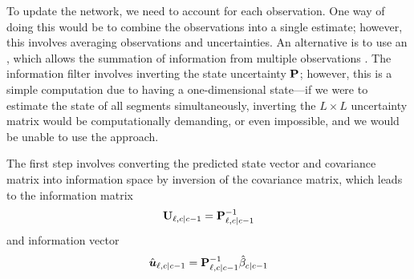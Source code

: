 To update the network, we need to account for each observation. One way of doing this would be to combine the observations into a single estimate; however, this involves averaging observations and uncertainties. An alternative is to use an \emph{\infil{}}, which allows the summation of information from multiple observations \citep{Mutambara_2000}. The information filter involves inverting the state uncertainty $\mathbf{P}$; however, this is a simple computation due to having a one-dimensional state---if we were to estimate the state of all segments simultaneously, inverting the $L\times L$ uncertainty matrix would be computationally demanding, or even impossible, and we would be unable to use the approach.




The first step involves converting the predicted state vector and covariance matrix into information space by inversion of the covariance matrix, which leads to the information matrix
\begin{equation}\label{eq:nw_if_inf_matrix}
\mathbf{U}_{\ell,c|c-1} = \mathbf{P}_{\ell,c|c-1}^{-1}
\end{equation}
and information vector
\begin{equation}\label{eq:nw_if_inf_vector}
\hat{\boldsymbol{u}}_{\ell,c|c-1} = \mathbf{P}_{\ell,c|c-1}^{-1} \hat{\beta}_{c|c-1}
\end{equation}


